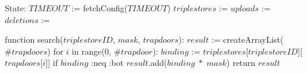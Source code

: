 State:
    $TIMEOUT$ := fetchConfig($TIMEOUT$)
    $triplestores$ := {}
    $uploads$ := {}
    $deletions$ := {}

function search($triplestoreID$, $mask$, $trapdoors$):
    $result$ := createArrayList($\#trapdoors$)
    for $i$ in range(0, $\#trapdoor$):
        $binding$ := $triplestores$[$triplestoreID$][$trapdoors$[$i$]]
        if $binding$ :neq :bot
            $result$.add($binding \; * \; mask$)
    return $result$